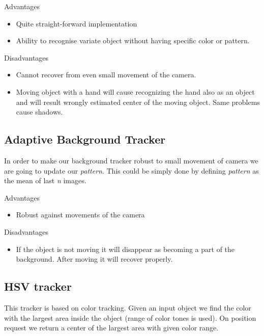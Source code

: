 
Advantages
\begin{itemize}
\item Quite straight-forward implementation
\item Ability to recognise variate object without having specific color or pattern.
\end{itemize}

Disadvantages
\begin{itemize}
\item Cannot recover from even small movement of the camera.
\item Moving object with a hand will cause recognizing the hand also as an object and will result wrongly estimated center of the moving object. Same problems cause shadows.
\end{itemize}

\subsection{Adaptive Background Tracker}

In order to make our background tracker robust to small movement of camera we
are going to update our \emph{pattern}. This could be simply done by defining \emph{pattern}
as the mean of last \emph{n} images.

Advantages
\begin{itemize}
\item Robust against movements of the camera
\end{itemize}

Disadvantages
\begin{itemize}
\item If the object is not moving it will disappear as becoming a part of the
background. After moving it will recover properly.
\end{itemize}

\subsection{HSV tracker}

This tracker is based on color tracking. Given an input object we find the
color with the largest area inside the object (range of color tones is used).
On position request we return a center of the largest area with given color
range.


